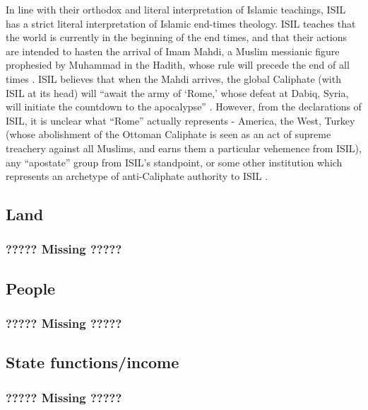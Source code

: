 \documentclass{report}
\begin{document}
    In line with their  orthodox and literal interpretation of Islamic teachings, ISIL  has a strict literal interpretation of Islamic  end-times theology. ISIL teaches that the world is currently in the beginning of the end times, and that their actions are intended to hasten the arrival of Imam Mahdi, a Muslim messianic figure prophesied by Muhammad in the Hadith, whose rule will precede the end of all times \cite{arabi2008divine,Wood2015}. ISIL believes that when the Mahdi arrives, the global Caliphate (with ISIL at its head)  will \enquote{await the army of \enquote{Rome,} whose defeat at Dabiq, Syria, will initiate the countdown to the apocalypse} \cite{Wood2015}. However, from the declarations of ISIL, it is unclear what \enquote{Rome} actually represents - America, the West, Turkey (whose abolishment of the Ottoman Caliphate is seen as an act of supreme treachery against all Muslims, and earns them a particular vehemence from ISIL), any \enquote{apostate} group from ISIL's standpoint, or some other institution which represents an archetype of anti-Caliphate authority to ISIL \cite{Mortada2014,Wood2015}. 
    
    
    


\subsection{Land}

\subsubsection{????? Missing ?????}

\subsection{People}

\subsubsection{????? Missing ?????}


\subsection{State functions/income}

\subsubsection{????? Missing ?????}
\end{document}
